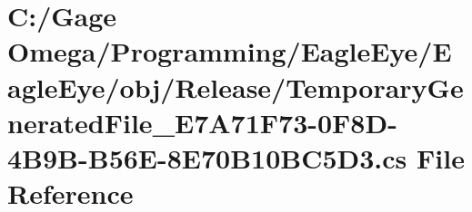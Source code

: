 \hypertarget{_release_2_temporary_generated_file___e7_a71_f73-0_f8_d-4_b9_b-_b56_e-8_e70_b10_b_c5_d3_8cs}{}\section{C\+:/\+Gage Omega/\+Programming/\+Eagle\+Eye/\+Eagle\+Eye/obj/\+Release/\+Temporary\+Generated\+File\+\_\+\+E7\+A71\+F73-\/0\+F8\+D-\/4\+B9\+B-\/\+B56\+E-\/8\+E70\+B10\+B\+C5\+D3.cs File Reference}
\label{_release_2_temporary_generated_file___e7_a71_f73-0_f8_d-4_b9_b-_b56_e-8_e70_b10_b_c5_d3_8cs}
